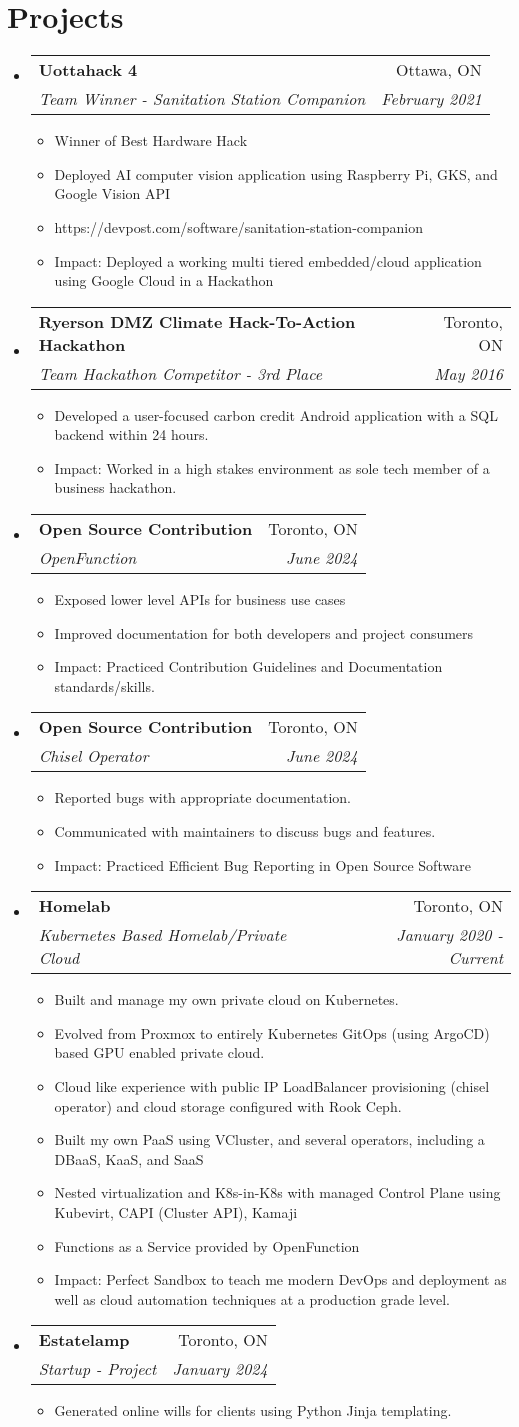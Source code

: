 \documentclass[letterpaper,11pt]{article}
\makeatletter
\newcommand{\resumeItem}[2]{
  \item\small{
    \textbf{#1}{#2 \vspace{-2pt}}
  }
}
\newcommand{\resumeSubheading}[4]{
  \vspace{-1pt}\item
    \begin{tabular*}{0.97\textwidth}[t]{l@{\extracolsep{\fill}}r}
      \textbf{#1} & #2 \\
      \textit{\small#3} & \textit{\small #4} \\
    \end{tabular*}\vspace{-5pt}
}
\newcommand{\resumeSubHeadingListStart}{\begin{itemize}[leftmargin=*]}
\newcommand{\resumeSubHeadingListEnd}{\end{itemize}}
\newcommand{\resumeItemListStart}{\begin{itemize}}
\newcommand{\resumeItemListEnd}{\end{itemize}\vspace{-5pt}}
\makeatother
\begin{document}
\section{Projects}
\resumeSubHeadingListStart
  \resumeSubheading
  {Uottahack 4}{Ottawa, ON}
  {Team Winner - Sanitation Station Companion}{February 2021}
    \resumeItemListStart
      \resumeItem{}
      {Winner of Best Hardware Hack}
      \resumeItem{}
      {Deployed AI computer vision application using Raspberry Pi, GKS, and Google Vision API}
      \resumeItem{}
      {https://devpost.com/software/sanitation-station-companion}
      \resumeItem{}
      {Impact: Deployed a working multi tiered embedded/cloud application using Google Cloud in a Hackathon}
    \resumeItemListEnd
  \resumeSubheading
  {Ryerson DMZ Climate Hack-To-Action Hackathon}{Toronto, ON}
  {Team Hackathon Competitor - 3rd Place}{May 2016}
    \resumeItemListStart
      \resumeItem{}
      {Developed a user-focused carbon credit Android application with a SQL backend within 24 hours.}
      \resumeItem{}
      {Impact: Worked in a high stakes environment as sole tech member of a business hackathon.}
    \resumeItemListEnd
  \resumeSubheading
  {Open Source Contribution}{Toronto, ON}
  {OpenFunction}{June 2024}
    \resumeItemListStart
      \resumeItem{}
      {Exposed lower level APIs for business use cases}
      \resumeItem{}
      {Improved documentation for both developers and project consumers}
      \resumeItem{}
      {Impact: Practiced Contribution Guidelines and Documentation standards/skills.}
    \resumeItemListEnd
  \resumeSubheading
  {Open Source Contribution}{Toronto, ON}
  {Chisel Operator}{June 2024}
    \resumeItemListStart
      \resumeItem{}
      {Reported bugs with appropriate documentation.}
      \resumeItem{}
      {Communicated with maintainers to discuss bugs and features.}
      \resumeItem{}
      {Impact: Practiced Efficient Bug Reporting in Open Source Software}
    \resumeItemListEnd
  \resumeSubheading
  {Homelab}{Toronto, ON}
  {Kubernetes Based Homelab/Private Cloud}{January 2020 - Current}
    \resumeItemListStart
      \resumeItem{}
      {Built and manage my own private cloud on Kubernetes.}
      \resumeItem{}
      {Evolved from Proxmox to entirely Kubernetes GitOps (using ArgoCD) based GPU enabled private cloud.}
      \resumeItem{}
      {Cloud like experience with public IP LoadBalancer provisioning (chisel operator) and cloud storage configured with Rook Ceph.}
      \resumeItem{}
      {Built my own PaaS using VCluster, and several operators, including a DBaaS, KaaS, and SaaS}
      \resumeItem{}
      {Nested virtualization and K8s-in-K8s with managed Control Plane using Kubevirt, CAPI (Cluster API), Kamaji}
      \resumeItem{}
      {Functions as a Service provided by OpenFunction}
      \resumeItem{}
      {Impact: Perfect Sandbox to teach me modern DevOps and deployment as well as cloud automation techniques at a production grade level.}
    \resumeItemListEnd
  \resumeSubheading
  {Estatelamp}{Toronto, ON}
  {Startup - Project}{January 2024}
    \resumeItemListStart
      \resumeItem{}
      {Generated online wills for clients using Python Jinja templating.}
    \resumeItemListEnd
\resumeSubHeadingListEnd
\end{document}
